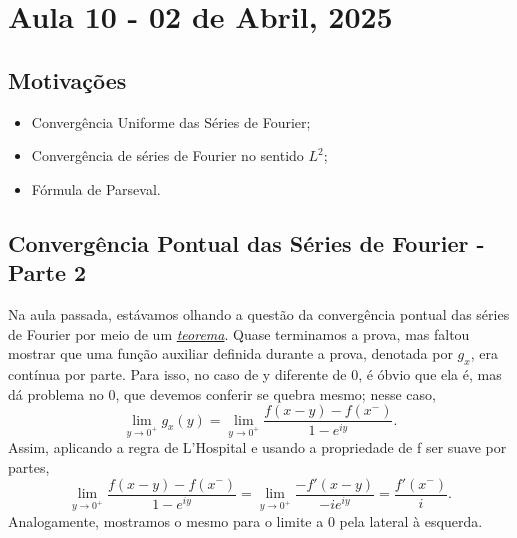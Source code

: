 \documentclass[../pde_notes.tex]{subfiles}
\begin{document}
\section{Aula 10 - 02 de Abril, 2025}
\subsection{Motivações}
\begin{itemize}
	\item Convergência Uniforme das Séries de Fourier;
	\item Convergência de séries de Fourier no sentido \(L^{2}\);
	\item Fórmula de Parseval.
\end{itemize}
\subsection{Convergência Pontual das Séries de Fourier - Parte 2}
Na aula passada, estávamos olhando a questão da convergência pontual das séries de Fourier por meio de um \hyperlink{ponintwise_convergence}{\textit{teorema}}. Quase terminamos a prova, mas faltou mostrar que uma função auxiliar definida durante a prova, denotada por \(g_{x}\), era contínua por parte. Para isso, no caso de y diferente de 0, é óbvio que ela é, mas dá problema no 0, que devemos conferir se quebra mesmo; nesse caso,
\[
	\lim_{y\to 0^{+}}g_{x}(y) = \lim_{y\to 0^{+}} \frac{f(x-y)-f(x^{-})}{1-e^{iy}}.
\]
Assim, aplicando a regra de L'Hospital e usando a propriedade de f ser suave por partes,
\[
	\lim_{y\to 0^{+}} \frac{f(x-y)-f(x^{-})}{1-e^{iy}}=\lim_{y\to 0^{+}}\frac{-f'(x-y)}{-ie^{iy}} = \frac{f'(x^{-})}{i}.
\]
Analogamente, mostramos o mesmo para o limite a 0 pela lateral à esquerda.
\end{document}
